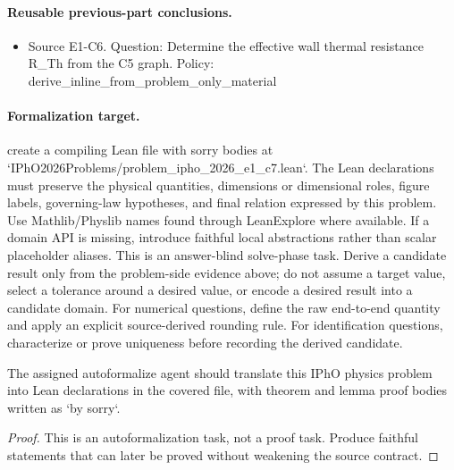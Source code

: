 \paragraph{Reusable previous-part conclusions.}
\begin{itemize}
\item Source E1-C6. Question: Determine the effective wall thermal resistance R\_Th from the C5 graph. Policy: derive\_inline\_from\_problem\_only\_material
\end{itemize}

\paragraph{Formalization target.}
create a compiling Lean file with sorry bodies at `IPhO2026Problems/problem\_ipho\_2026\_e1\_c7.lean`.
The Lean declarations must preserve the physical quantities, dimensions or dimensional roles, figure labels, governing-law hypotheses, and final relation expressed by this problem.
Use Mathlib/Physlib names found through LeanExplore where available. If a domain API is missing, introduce faithful local abstractions rather than scalar placeholder aliases.
This is an answer-blind solve-phase task. Derive a candidate result only from the problem-side evidence above; do not assume a target value, select a tolerance around a desired value, or encode a desired result into a candidate domain.
For numerical questions, define the raw end-to-end quantity and apply an explicit source-derived rounding rule. For identification questions, characterize or prove uniqueness before recording the derived candidate.

\begin{theorem}
\label{thm:physics:ipho_2026_e1_c7:target}
The assigned autoformalize agent should translate this IPhO physics problem into Lean declarations in the covered file, with theorem and lemma proof bodies written as `by sorry`.
\end{theorem}
\begin{proof}
This is an autoformalization task, not a proof task. Produce faithful statements that can later be proved without weakening the source contract.
\end{proof}
